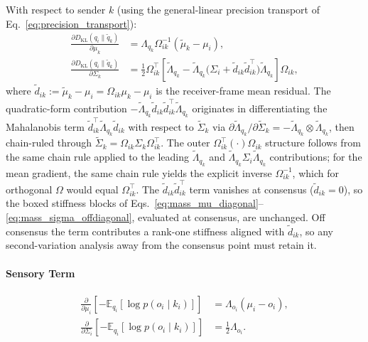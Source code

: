 With respect to sender $k$ (using the general-linear precision transport of Eq.~\eqref{eq:precision_transport}):
\begin{align}
\frac{\partial D_{\mathrm{KL}}(q_i \| \tilde{q}_k)}{\partial \mu_k} &= \Lambda_{q_k}\Omega_{ik}^{-1}(\tilde{\mu}_k - \mu_i), \\
\frac{\partial D_{\mathrm{KL}}(q_i \| \tilde{q}_k)}{\partial \Sigma_k} &= \frac{1}{2}\Omega_{ik}^\top\left[\tilde{\Lambda}_{q_k} - \tilde{\Lambda}_{q_k}\big(\Sigma_i + \tilde{d}_{ik}\tilde{d}_{ik}^\top\big)\tilde{\Lambda}_{q_k}\right]\Omega_{ik},
\end{align}
where $\tilde{d}_{ik} := \tilde{\mu}_k - \mu_i = \Omega_{ik}\mu_k - \mu_i$ is the receiver-frame mean residual. The quadratic-form contribution $-\tilde{\Lambda}_{q_k}\tilde{d}_{ik}\tilde{d}_{ik}^\top\tilde{\Lambda}_{q_k}$ originates in differentiating the Mahalanobis term $\tilde{d}_{ik}^\top \tilde{\Lambda}_{q_k}\tilde{d}_{ik}$ with respect to $\tilde{\Sigma}_k$ via $\partial \tilde{\Lambda}_{q_k}/\partial \tilde{\Sigma}_k = -\tilde{\Lambda}_{q_k}\otimes\tilde{\Lambda}_{q_k}$, then chain-ruled through $\tilde{\Sigma}_k = \Omega_{ik}\Sigma_k\Omega_{ik}^\top$. The outer $\Omega_{ik}^\top(\cdot)\Omega_{ik}$ structure follows from the same chain rule applied to the leading $\tilde{\Lambda}_{q_k}$ and $\tilde{\Lambda}_{q_k}\Sigma_i\tilde{\Lambda}_{q_k}$ contributions; for the mean gradient, the same chain rule yields the explicit inverse $\Omega_{ik}^{-1}$, which for orthogonal $\Omega$ would equal $\Omega_{ik}^\top$. The $\tilde{d}_{ik}\tilde{d}_{ik}^\top$ term vanishes at consensus ($\tilde{d}_{ik} = 0$), so the boxed stiffness blocks of Eqs.~\eqref{eq:mass_mu_diagonal}--\eqref{eq:mass_sigma_offdiagonal}, evaluated at consensus, are unchanged. Off consensus the term contributes a rank-one stiffness aligned with $\tilde{d}_{ik}$, so any second-variation analysis away from the consensus point must retain it.

\paragraph{Sensory Term}
\begin{align}
\frac{\partial}{\partial \mu_i}\left[-\mathbb{E}_{q_i}[\log p(o_i \mid k_i)]\right] &= \Lambda_{o_i}(\mu_i - o_i), \\
\frac{\partial}{\partial \Sigma_i}\left[-\mathbb{E}_{q_i}[\log p(o_i \mid k_i)]\right] &= \frac{1}{2}\Lambda_{o_i}.
\end{align}

